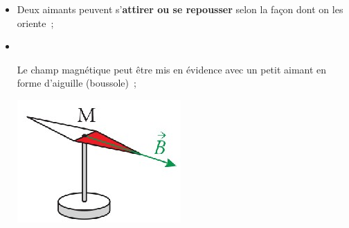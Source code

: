 \documentclass[../../main/main.tex]{subfiles}
\begin{document}
\begin{itemize}
	\item Deux aimants peuvent s'\textbf{attirer ou se repousser} selon la façon
	      dont on les oriente~;
	\item ~
	      \smallbreak
	      \vspace{-30pt}
	      \noindent
	      \begin{minipage}[c]{.80\linewidth}
		      Le champ magnétique peut être mis en évidence avec un petit aimant en
		      forme d'aiguille (boussole)~;
	      \end{minipage}
	      \begin{minipage}[c]{.19\linewidth}
		      \begin{center}
			      \includegraphics[width=.7\linewidth]{boussole}
		      \end{center}
	      \end{minipage}
\end{itemize}
\end{document}
